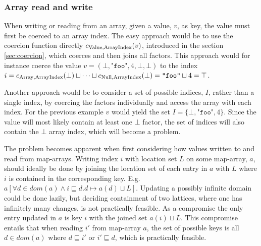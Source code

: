 \subsubsection{Array read and write}
When writing or reading from an array, given a value, $v$, as key, the value must first be coerced to an array index. The easy approach would be to use the coercion function directly $c_{\text{Value}, \text{ArrayIndex}}(v)$, introduced in the section \ref{sec:coercion}, which coerces and then joins all factors. This approach would for instance coerce the value $v = (\bot, \texttt{"foo"}, 4, \bot, \bot)$ to the index $i = c_{\text{Array}, \text{ArrayIndex}}(\bot)\sqcup\cdots\sqcup c_{\text{Null}, \text{ArrayIndex}}(\bot) = \texttt{"foo"} \sqcup 4 = \top $. 

Another approach would be to consider a set of possible indices, $I$, rather than a single index, by coercing the factors individually and access the array with each index. For the previous example $v$ would yield the set $I = \{\bot, \texttt{"foo"}, 4\}$. Since the value will most likely contain at least one $\bot$ factor, the set of indices will also contain the $\bot$ array index, which will become a problem. 

The problem becomes apparent when first considering how values written to and read from map-arrays. Writing index $i$ with location set $L$ on some map-array, $a$, should ideally be done by joining the location set of each entry in $a$ with $L$ where $i$ is contained in the corresponding key. E.g. $a[\forall d \in dom(a)\wedge i \sqsubseteq d. d \mapsto a(d)\sqcup L]$. Updating a possibly infinite domain could be done lazily, but deciding containment of two lattices, where one has infinitely many changes, is not practically feasible. As a compromise the only entry updated in $a$ is key $i$ with the joined set $a(i)\sqcup L$. This compromise entails that when reading $i'$ from map-array $a$, the set of possible keys is all $d\in dom(a)$ where $d\sqsubseteq i'$ or $i'\sqsubseteq d$, which is practically feasible. 

